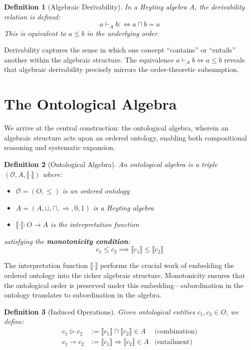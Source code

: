 \documentclass[12pt,a4paper]{article}
\newtheorem{definition}{Definition}[section]
\newcommand{\onto}{\mathcal{O}}
\newcommand{\sem}[1]{\llbracket #1 \rrbracket}
\begin{document}
\begin{definition}[Algebraic Derivability]
In a Heyting algebra $A$, the \emph{derivability relation} is defined:
$$
a \vdash_A b :\iff a \sqcap b = a
$$
This is equivalent to $a \leq b$ in the underlying order.
\end{definition}

Derivability captures the sense in which one concept ``contains'' or ``entails'' another within the algebraic structure. The equivalence $a \vdash_A b \iff a \leq b$ reveals that algebraic derivability precisely mirrors the order-theoretic subsumption.

\section{The Ontological Algebra}

We arrive at the central construction: the ontological algebra, wherein an algebraic structure acts upon an ordered ontology, enabling both compositional reasoning and systematic expansion.

\begin{definition}[Ontological Algebra]
An \emph{ontological algebra} is a triple $(\onto, A, \sem{\cdot})$ where:
\begin{itemize}
    \item $\onto = (O, \leq)$ is an ordered ontology
    \item $A = (A, \sqcup, \sqcap, \Rightarrow, 0, 1)$ is a Heyting algebra
    \item $\sem{\cdot} : O \to A$ is the \emph{interpretation function}
\end{itemize}
satisfying the \textbf{monotonicity condition}:
$$
c_1 \leq c_2 \implies \sem{c_1} \leq \sem{c_2}
$$
\end{definition}

The interpretation function $\sem{\cdot}$ performs the crucial work of embedding the ordered ontology into the richer algebraic structure. Monotonicity ensures that the ontological order is preserved under this embedding---subordination in the ontology translates to subordination in the algebra.

\begin{definition}[Induced Operations]
Given ontological entities $c_1, c_2 \in O$, we define:
\begin{align*}
    c_1 \triangleright c_2 &:= \sem{c_1} \sqcap \sem{c_2} \in A & \text{(combination)}\\
    c_1 \multimap c_2 &:= \sem{c_1} \Rightarrow \sem{c_2} \in A & \text{(entailment)}
\end{align*}
\end{definition}
\end{document}
